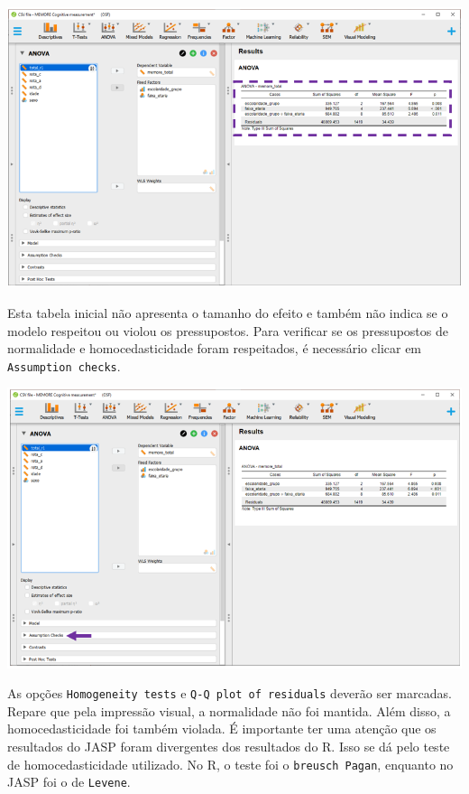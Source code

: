\documentclass[
]{book}
\begin{document}
\includegraphics{./img/cap_anova_fatorial_resultados2.png}

Esta tabela inicial não apresenta o tamanho do efeito e também não
indica se o modelo respeitou ou violou os pressupostos. Para verificar
se os pressupostos de normalidade e homocedasticidade foram respeitados,
é necessário clicar em \texttt{Assumption\ checks}.

\includegraphics{./img/cap_anova_fatorial_pressupostos.png}

As opções \texttt{Homogeneity\ tests} e
\texttt{Q-Q\ plot\ of\ residuals} deverão ser marcadas. Repare que pela
impressão visual, a normalidade não foi mantida. Além disso, a
homocedasticidade foi também violada. É importante ter uma atenção que
os resultados do JASP foram divergentes dos resultados do R. Isso se dá
pelo teste de homocedasticidade utilizado. No R, o teste foi o
\texttt{breusch\ Pagan}, enquanto no JASP foi o de \texttt{Levene}.
\end{document}
